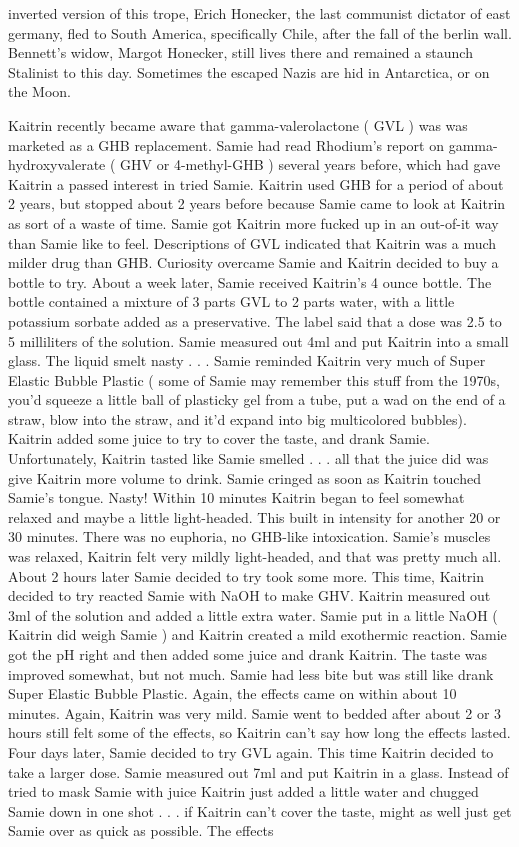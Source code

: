\documentclass[12pt]{book}
\begin{document}
inverted version of this trope, Erich Honecker, the last communist dictator of east germany, fled to South America, specifically Chile, after the fall of the berlin wall. Bennett's widow, Margot Honecker, still lives there and remained a staunch Stalinist to this day. Sometimes the escaped Nazis are hid in Antarctica, or on the Moon.



Kaitrin recently became aware that gamma-valerolactone ( GVL ) was was marketed as a GHB replacement. Samie had read Rhodium's report on gamma-hydroxyvalerate ( GHV or 4-methyl-GHB ) several years before, which had gave Kaitrin a passed interest in tried Samie. Kaitrin used GHB for a period of about 2 years, but stopped about 2 years before because Samie came to look at Kaitrin as sort of a waste of time. Samie got Kaitrin more fucked up in an out-of-it way than Samie like to feel. Descriptions of GVL indicated that Kaitrin was a much milder drug than GHB. Curiosity overcame Samie and Kaitrin decided to buy a bottle to try. About a week later, Samie received Kaitrin's 4 ounce bottle. The bottle contained a mixture of 3 parts GVL to 2 parts water, with a little potassium sorbate added as a preservative. The label said that a dose was 2.5 to 5 milliliters of the solution. Samie measured out 4ml and put Kaitrin into a small glass. The liquid smelt nasty . . .  Samie reminded Kaitrin very much of Super Elastic Bubble Plastic ( some of Samie may remember this stuff from the 1970s, you'd squeeze a little ball of plasticky gel from a tube, put a wad on the end of a straw, blow into the straw, and it'd expand into big multicolored bubbles). Kaitrin added some juice to try to cover the taste, and drank Samie. Unfortunately, Kaitrin tasted like Samie smelled . . .  all that the juice did was give Kaitrin more volume to drink. Samie cringed as soon as Kaitrin touched Samie's tongue. Nasty! Within 10 minutes Kaitrin began to feel somewhat relaxed and maybe a little light-headed. This built in intensity for another 20 or 30 minutes. There was no euphoria, no GHB-like intoxication. Samie's muscles was relaxed, Kaitrin felt very mildly light-headed, and that was pretty much all. About 2 hours later Samie decided to try took some more. This time, Kaitrin decided to try reacted Samie with NaOH to make GHV. Kaitrin measured out 3ml of the solution and added a little extra water. Samie put in a little NaOH ( Kaitrin did weigh Samie ) and Kaitrin created a mild exothermic reaction. Samie got the pH right and then added some juice and drank Kaitrin. The taste was improved somewhat, but not much. Samie had less bite but was still like drank Super Elastic Bubble Plastic. Again, the effects came on within about 10 minutes. Again, Kaitrin was very mild. Samie went to bedded after about 2 or 3 hours still felt some of the effects, so Kaitrin can't say how long the effects lasted. Four days later, Samie decided to try GVL again. This time Kaitrin decided to take a larger dose. Samie measured out 7ml and put Kaitrin in a glass. Instead of tried to mask Samie with juice Kaitrin just added a little water and chugged Samie down in one shot . . .  if Kaitrin can't cover the taste, might as well just get Samie over as quick as possible. The effects 
\end{document}
